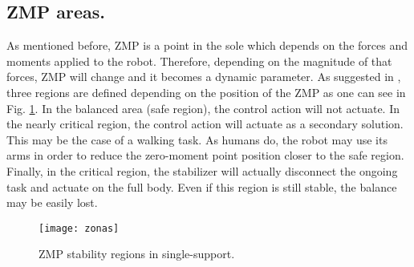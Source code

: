 \subsection{ZMP areas.}
As mentioned before, ZMP is a point in the sole which depends on the forces and moments applied to the robot. Therefore, depending on the magnitude of that forces, ZMP will change and it becomes a dynamic parameter. As suggested in \cite{Vuk2007}, three regions are defined depending on the position of the ZMP as one can see in Fig. \ref{fig:zonas}.
In the balanced area (safe region), the control action will not actuate. In the nearly critical region, the control action will actuate as a secondary solution. This may be the case of a walking task. As humans do, the robot may use its arms in order to reduce the zero-moment point position closer to the safe region. Finally, in the critical region, the stabilizer will actually disconnect the ongoing task and actuate on the full body. Even if this region is still stable, the balance may be easily lost. 


\begin{figure}[!hbt]
\centering
\texttt{[image: zonas]}
\caption{ZMP stability regions in single-support.}
\label{fig:zonas}
\end{figure}



